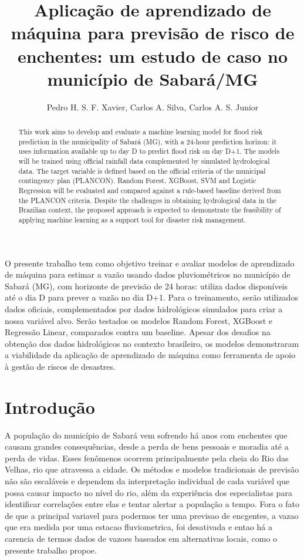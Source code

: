 \documentclass[12pt]{article}
\title{Aplicação de aprendizado de máquina para previsão de risco de enchentes: um estudo de caso no município de Sabará/MG}
\author{Pedro H. S. F. Xavier\inst{1}, Carlos A. Silva\inst{1}, Carlos A. S. Junior\inst{1}}
\begin{document}
\maketitle

\begin{abstract}
  This work aims to develop and evaluate a machine learning model for flood risk prediction in the municipality of Sabará (MG), with a 24-hour prediction horizon: it uses information available up to day D to predict flood risk on day D+1. The models will be trained using official rainfall data complemented by simulated hydrological data. The target variable is defined based on the official criteria of the municipal contingency plan (PLANCON). Random Forest, XGBoost, SVM and Logistic Regression will be evaluated and compared against a rule-based baseline derived from the PLANCON criteria. Despite the challenges in obtaining hydrological data in the Brazilian context, the proposed approach is expected to demonstrate the feasibility of applying machine learning as a support tool for disaster risk management.
\end{abstract}

\begin{resumo}
  O presente trabalho tem como objetivo treinar e avaliar modelos de aprendizado de máquina para estimar a vazão usando dados pluviométricos no município de Sabará (MG), com horizonte de previsão de 24 horas: utiliza dados disponíveis até o dia D para prever a vazão no dia D+1. Para o treinamento, serão utilizados dados oficiais, complementados por dados hidrológicos simulados para criar a nossa variável alvo. Serão testados os modelos Random Forest, XGBoost e Regressão Linear, comparados contra um baseline. Apesar dos desafios na obtenção dos dados hidrológicos no contexto brasileiro, os modelos demonstraram a viabilidade da aplicação de aprendizado de máquina como ferramenta de apoio à gestão de riscos de desastres.
\end{resumo}

\section{Introdução}

A população do município de Sabará vem sofrendo há anos com enchentes que causam grandes consequências, desde a perda de bens pessoais e moradia até a perda de vidas. Esses fenômenos ocorrem principalmente pela cheia do Rio das Velhas, rio que atravessa a cidade. Os métodos e modelos tradicionais de previsão não são escaláveis e dependem da interpretação individual de cada variável que possa causar impacto no nível do rio, além da experiência dos especialistas para identificar correlações entre elas e tentar alertar a população a tempo. Fora o fato de que a principal variavel para podermos ter uma previsao de encgentes, a vazao que era medida por uma estacao fluviometrica, foi desativada e entao há a carencia de termos dados de vazoes baseados em alternativas locais, como o presente trabalho propoe.
\end{document}
